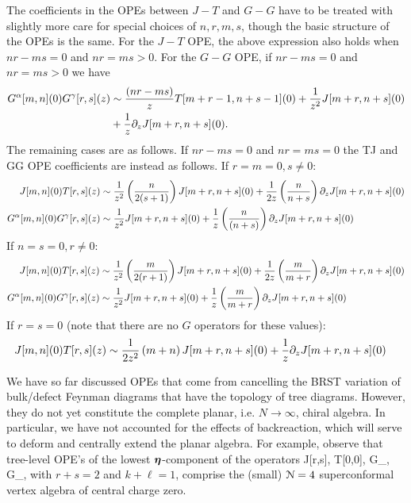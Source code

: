 \documentclass[../main.tex]{subfiles}
\begin{document}
The coefficients in the OPEs between $J-T$ and $G-G$ have to be treated with slightly more care for special choices of $n, r, m, s$, though the basic structure of the OPEs is the same.
For the $J-T$ OPE, the above expression also holds when $nr - ms = 0$ and $nr = m s >0$. 
For the $G-G$ OPE, if $n r - ms = 0$ and $nr = ms > 0$ we have
\begin{align}
G^{\alpha}[m, n](0)G^{\gamma}[r, s](z) &\sim {(nr-ms) \over z}T[m + r -1, n + s -1](0) + {1 \over z^2}J[m + r, n + s](0) \\ \nonumber
&+{1 \over z}\partial_z J[m + r, n+s](0).
\end{align}
The remaining cases are as follows. If $nr-ms = 0$ and $n r = ms = 0$ the TJ and GG OPE coefficients are instead as follows. \newline
If $r = m = 0, s \neq 0$: 
\begin{align}
J[m, n](0)T[r, s](z) &\sim {1 \over z^2}\left({n \over 2(s + 1)}\right)J[m + r, n + s](0) +{1 \over 2 z}\left({n \over n + s} \right)\partial_z J[m + r, n + s](0) \\ \nonumber
G^{\alpha}[m, n](0)G^{\gamma}[r, s](z) &\sim {1 \over z^2}J[m + r, n + s](0) +{1 \over z}\left({n \over  (n + s)}\right)\partial_z J[m + r, n+s](0)
\end{align}
If $n = s = 0, r \neq 0$: 
\begin{align}
J[m, n](0)T[r, s](z) &\sim {1 \over z^2}\left({m \over 2(r + 1)}\right)J[m + r, n + s](0) +{1 \over 2 z}\left({m \over m + r} \right)\partial_z J[m + r, n + s](0)\\
G^{\alpha}[m, n](0)G^{\gamma}[r, s](z) &\sim {1 \over z^2}J[m + r, n + s](0) +{1 \over z}\left({m \over m + r}\right)\partial_z J[m + r, n+s](0)
\end{align}
If $r = s= 0$ (note that there are no $G$ operators for these values):
\begin{align}
J[m, n](0)T[r, s](z) &\sim {1 \over 2 z^2}\left(m + n\right)J[m + r, n + s](0) +{1 \over  z}\partial_z J[m + r, n + s](0)
\end{align}

We have so far discussed OPEs that come from cancelling the BRST variation of bulk/defect Feynman diagrams that have the topology of tree diagrams. However, they do not yet constitute the complete planar, i.e. $N \rightarrow \infty$, chiral algebra. In particular, we have not accounted for the effects of backreaction, which will serve to deform and centrally extend the planar algebra. 
For example, observe that tree-level OPE's of the lowest $\boldsymbol\eta$-component of the operators
\beqn
J[r,s], T[0,0], G_\alpha[k,\ell], G_\gamma[k,\ell],
\eeqn
with $r+s=2$ and $k+\ell=1$, comprise the (small) $\mathcal{N}=4$ superconformal vertex algebra of central charge zero.
\end{document}

